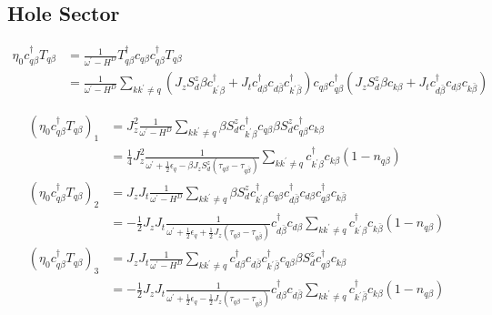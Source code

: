 \documentclass[14pt]{extarticle}
\numberwithin{equation}{section}
\begin{document}
\subsection{Hole Sector}
\begin{align}
 \eta_0 c^{\dag}_{q\beta}T_{q \beta} &=  \frac{1}{\omega^{\prime} - H^D} T_{q\beta}^{\dag}c_{q\beta} c^{\dag}_{q\beta}T_{q\beta}  \nonumber\\
&= \frac{1}{\omega^{\prime} - H^D} \sum\limits_{kk^{\prime}\ne q} \left(  J_z S_d^z \beta c_{k^{\prime}\beta}^{\dag} + J_t c^{\dag}_{d\beta} c_{d\bar{\beta}} c^{\dag}_{k^{\prime}\bar{\beta}}  \right) c_{q\beta} c^{\dag}_{q\beta}\left( J_z S_d^z \beta c_{k\beta} + J_t c^{\dag}_{d\bar{\beta}} c_{d\beta} c_{k\bar{\beta}} \right)  \label{eq:25}
\end{align}

\begin{subequations} \label{eq:26} 
 \begin{align}
\left( \eta_0 c^{\dag}_{q\beta}T_{q \beta} \right)_1  &= J_z^2\frac{1}{\omega^{\prime} - H^D}\sum\limits_{kk^{\prime}\ne q} \beta S_d^z c^{\dag}_{k^{\prime}\beta}c_{q\beta}  \beta S_d^z c^{\dag}_{q\beta}c_{k\beta} \nonumber\\
                                        &= \frac{1}{4} J_z^2 \frac{1}{\omega^{\prime} + \frac{1}{2} \epsilon_q -\beta J_zS^z_d \left( \tau_{q\beta} - \tau_{q\bar{\beta}} \right)}  \sum\limits_{kk^{\prime}\ne q} c^{\dag}_{k^{\prime}\beta} c_{k\beta} \left( 1 - n_{q\beta} \right)   \label{eq:27}  \\
     \left( \eta_0 c^{\dag}_{q\beta}T_{q \beta} \right)_2  &= J_z J_t  \frac{1}{\omega^{\prime} - H^D}  \sum\limits_{kk^{\prime}\ne q} \beta S_d^z c^{\dag}_{k^{\prime}\beta}c_{q\beta} c^{\dag}_{d\bar{\beta}} c_{d\beta} c^{\dag}_{q\beta}c_{k\bar{\beta}} \nonumber\\
                                        &= - \frac{1}{2} J_z J_t  \frac{1}{\omega^{\prime} + \frac{1}{2}\epsilon_q + \frac{1}{2} J_z \left( \tau_{q\beta} - \tau_{q\bar{\beta}} \right)} c^{\dag}_{d\bar{\beta}} c_{d\beta} \sum\limits_{kk^{\prime}\ne q}  c^{\dag}_{k^{\prime}\beta}c_{k\bar{\beta}} \left( 1 - n_{q\beta} \right) \label{eq:28} \\
     \left( \eta_0 c^{\dag}_{q\beta}T_{q \beta} \right)_3  &= J_z J_t \frac{1}{\omega^{\prime} - H^D} \sum\limits_{kk^{\prime}\ne q} c^{\dag}_{d\beta} c_{d\bar{\beta}} c^{\dag}_{k^{\prime}\bar{\beta}}c_{q\beta}   \beta S_d^z c^{\dag}_{q\beta}c_{k\beta} \nonumber\\
                                        &= - \frac{1}{2} J_z J_t  \frac{1}{\omega^{\prime} + \frac{1}{2}\epsilon_q - \frac{1}{2} J_z \left( \tau_{q\beta} - \tau_{q\bar{\beta}} \right)} c^{\dag}_{d\beta} c_{d\bar{\beta}} \sum\limits_{kk^{\prime}\ne q}  c^{\dag}_{k^{\prime}\bar{\beta}}c_{k\beta} \left( 1 - n_{q\beta} \right) \label{eq:29} \\

\end{align}
\end{subequations}
\end{document}
